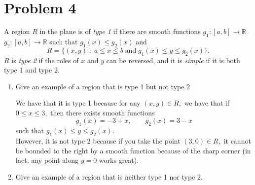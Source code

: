 \documentclass[11pt]{article}
\newcommand{\bbR}{\mathbb{R}}
\begin{document}
\newpage
\section*{Problem 4}
\begin{problem}
    A region $R$ in the plane is of \textit{type 1} if there are smooth functions $g_1: [a,b] \to \bbR$ $g_2 : [a,b]\to \bbR$ such that $g_1(x)\leq g_2(x)$ and 
    \[R = \{(x,y) \; : \; a \leq x \leq b \; \text{and} \; g_1(x)\leq y \leq g_2(x)\}.\] $R$ is \textit{type 2} if the roles of $x$ and $y$ can be reversed, and it is \textit{simple} if it is both type 1 and type 2.
\end{problem}
\begin{enumerate}
    \item 
    \begin{problem}
        Give an example of a region that is type 1 but not type 2
    \end{problem}
    \begin{solution}


We have that it is type 1 because for any $(x,y)\in R,$ we have that if $0\leq x \leq 3,$ then there exists smooth functions 
\[g_1(x) = -3 + x, \qquad g_2(x) = 3 -x\] such that $g_1(x)\leq y \leq g_2(x).$\\

However, it is not type 2 because if you take the point $(3,0)\in R,$ it cannot be bounded to the right by a smooth function because of the sharp corner (in fact, any point along $y=0$ works great).
    \end{solution}
\item
\begin{problem}
    Give an example of a region that is neither type 1 nor type 2.
\end{problem}
\begin{solution}
\end{solution}
\end{enumerate}
\end{document}
